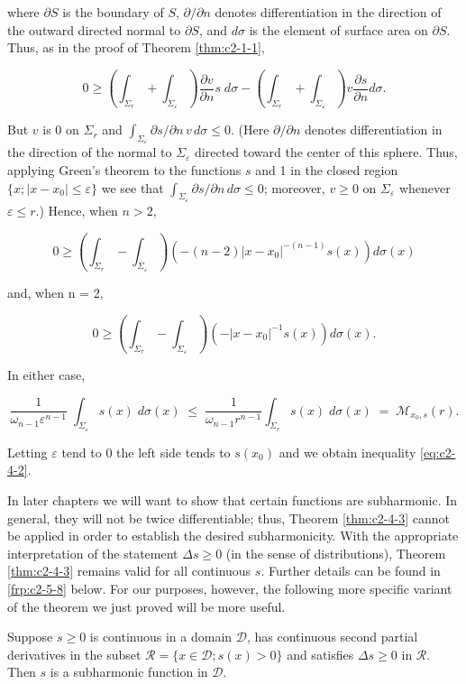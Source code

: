 where $\partial S$ is the boundary of $S$, $\partial/\partial n$ denotes differentiation in the direction of the outward directed normal to $\partial S$, and $d\sigma$ is the element of surface area on $\partial S$. Thus, as in the proof of Theorem \ref{thm:c2-1-1},

\[
0\geq\left(\int_{\Sigma_{r}}+\int_{\Sigma_{\varepsilon}}\right)\frac{\partial v}{\partial n}s\;d\sigma-\left(\int_{\Sigma_{r}}+\int_{\Sigma_{\varepsilon}}\right)v\frac{\partial s}{\partial n}d\sigma.
\]

But $v$ is 0 on $\Sigma_r$ and $\int_{\Sigma_\varepsilon} \partial s / \partial n \, v \, d\sigma \leq 0$. (Here $\partial / \partial n$ denotes differentiation in the direction of the normal to $\Sigma_\varepsilon$ directed toward the center of this sphere. Thus, applying Green's theorem to the functions $s$ and 1 in the closed region $\{x; |x - x_0| \leq \varepsilon\}$ we see that $\int_{\Sigma_\varepsilon} \partial s / \partial n \, d\sigma \leq 0$; moreover, $v \geq 0$ on $\Sigma_\varepsilon$ whenever $\varepsilon \leq r$.) Hence, when $n > 2$,

\[
0\geq\left(\int_{\Sigma_{r}}-\int_{\Sigma_{\varepsilon}}\right)\left(-(n-2)|x-x_{0}|^{-(n-1)}s(x)\right)d\sigma(x)
\]

and, when n = 2,

\[
0\geq\left(\int_{\Sigma_{\tau}}-\int_{\Sigma_{\varepsilon}}\right)\left(-\left|x-x_{0}\right|^{-1}s(x)\right)d\sigma(x).
\]

In either case,

\[
\frac{1}{\omega_{n-1}\varepsilon^{n-1}}\;\int_{\Sigma_{\varepsilon}}s(x)\;d\sigma(x)\;\leq\;\frac{1}{\omega_{n-1}r^{n-1}}\int_{\Sigma_{r}}s(x)\;d\sigma(x)\;=\;\mathcal{M}_{x_{0},s}(r).
\]

Letting $\varepsilon$ tend to 0 the left side tends to $s(x_{0})$ and we obtain inequality \eqref{eq:c2-4-2}.

In later chapters we will want to show that certain functions are subharmonic. In general, they will not be twice differentiable; thus, Theorem \ref{thm:c2-4-3} cannot be applied in order to establish the desired subharmonicity. With the appropriate interpretation of the statement $\Delta s \geq 0$ (in the sense of distributions), Theorem \ref{thm:c2-4-3} remains valid for all continuous $s$. Further details can be found in \eqref{frp:c2-5-8} below. For our purposes, however, the following more specific variant of the theorem we just proved will be more useful.

\begin{theorem}
\label{thm:c2-4-4}
Suppose $s \geq 0$ is continuous in a domain $\mathcal{D}$, has continuous second partial derivatives in the subset $\mathcal{R} = \{x \in \mathcal{D}; s(x) > 0\}$ and satisfies $\Delta s \geq 0$ in $\mathcal{R}$. Then $s$ is a subharmonic function in $\mathcal{D}$.
\end{theorem}

